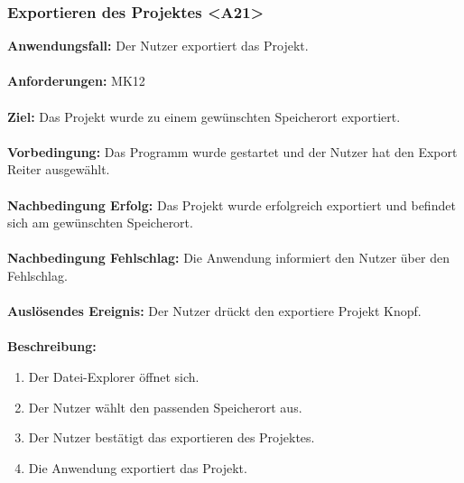 \documentclass[parskip=full]{scrartcl} %
\begin{document}
\subsubsection*{Exportieren des Projektes <A21>}
\textbf{Anwendungsfall:} Der Nutzer exportiert das Projekt. \\\\
\textbf{Anforderungen:} MK12\\\\
\textbf{Ziel:} Das Projekt wurde zu einem gewünschten Speicherort exportiert.\\\\
\textbf{Vorbedingung:} Das Programm wurde gestartet und der Nutzer hat den Export Reiter ausgewählt.\\\\
\textbf{Nachbedingung Erfolg:} Das Projekt wurde erfolgreich exportiert und befindet sich am gewünschten Speicherort.\\\\
\textbf{Nachbedingung Fehlschlag:} Die Anwendung informiert den Nutzer über den Fehlschlag.\\\\
\textbf{Auslösendes Ereignis:}  Der Nutzer drückt den exportiere Projekt Knopf. \\\\
\textbf{Beschreibung:}
\begin{enumerate}
    \item Der Datei-Explorer öffnet sich.
    \item Der Nutzer wählt den passenden Speicherort aus.
    \item Der Nutzer bestätigt das exportieren des Projektes.
    \item Die Anwendung exportiert das Projekt.
\end{enumerate}
\newpage
\end{document}
